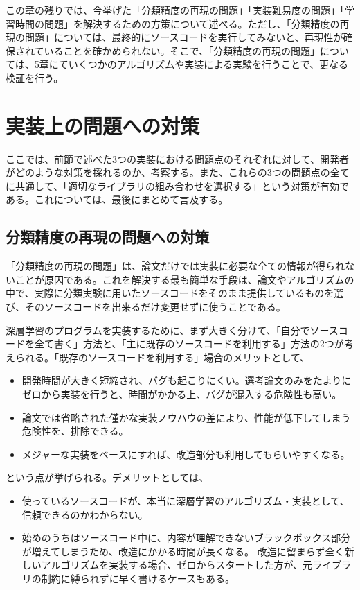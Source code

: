 この章の残りでは、今挙げた「分類精度の再現の問題」「実装難易度の問題」「学習時間の問題」を解決するための方策について述べる。ただし、「分類精度の再現の問題」については、最終的にソースコードを実行してみないと、再現性が確保されていることを確かめられない。そこで、「分類精度の再現の問題」については、5章にていくつかのアルゴリズムや実装による実験を行うことで、更なる検証を行う。

\section{実装上の問題への対策}
ここでは、前節で述べた3つの実装における問題点のそれぞれに対して、開発者がどのような対策を採れるのか、考察する。また、これらの3つの問題点の全てに共通して、「適切なライブラリの組み合わせを選択する」という対策が有効である。これについては、最後にまとめて言及する。

\subsection{分類精度の再現の問題への対策}
\label{subsec:c4_provision_replication}
「分類精度の再現の問題」は、論文だけでは実装に必要な全ての情報が得られないことが原因である。これを解決する最も簡単な手段は、論文やアルゴリズムの中で、実際に分類実験に用いたソースコードをそのまま提供しているものを選び、そのソースコードを出来るだけ変更せずに使うことである。

深層学習のプログラムを実装するために、まず大きく分けて、「自分でソースコードを全て書く」方法と、「主に既存のソースコードを利用する」方法の2つが考えられる。「既存のソースコードを利用する」場合のメリットとして、
\begin{itemize}
\item 開発時間が大きく短縮され、バグも起こりにくい。選考論文のみをたよりにゼロから実装を行うと、時間がかかる上、バグが混入する危険性も高い。
\item 論文では省略された僅かな実装ノウハウの差により、性能が低下してしまう危険性を、排除できる。
\item メジャーな実装をベースにすれば、改造部分も利用してもらいやすくなる。
\end{itemize}
という点が挙げられる。デメリットとしては、
\begin{itemize}
\item 使っているソースコードが、本当に深層学習のアルゴリズム・実装として、信頼できるのかわからない。
\item 始めのうちはソースコード中に、内容が理解できないブラックボックス部分が増えてしまうため、改造にかかる時間が長くなる。 改造に留まらず全く新しいアルゴリズムを実装する場合、ゼロからスタートした方が、元ライブラリの制約に縛られずに早く書けるケースもある。
\end{itemize}

